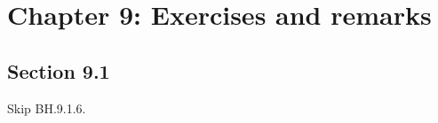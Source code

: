 



\chapter{Chapter 9: Exercises and remarks}

\section{Section 9.1}

\begin{remark}
Skip BH.9.1.6.
\end{remark}

